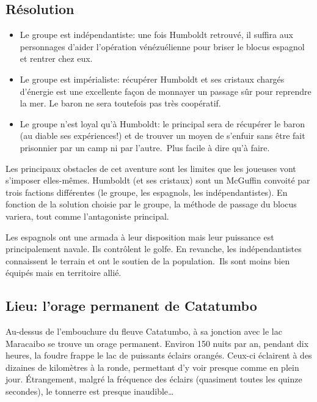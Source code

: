 \subsection{Résolution}

\begin{itemize}
	\item Le groupe est indépendantiste: une fois Humboldt retrouvé, il \og suffira \fg aux personnages d'aider l'opération vénézuélienne pour briser le blocus espagnol et rentrer chez eux. 
	\item Le groupe est impérialiste: récupérer Humboldt et ses cristaux chargés d'énergie est une excellente façon de monnayer un passage sûr pour reprendre la mer. Le baron ne sera toutefois pas très coopératif.
	\item Le groupe n'est loyal qu'à Humboldt: le principal sera de récupérer le baron (au diable ses expériences!) et de trouver un moyen de s'enfuir sans être fait prisonnier par un camp ni par l'autre. Plus facile à dire qu'à faire.
\end{itemize}

Les principaux obstacles de cet aventure sont les limites que les joueuses vont s'imposer elles-mêmes.
Humboldt (et ses cristaux) sont un McGuffin convoité par trois factions différentes (le groupe, les espagnols, les indépendantistes).
En fonction de la solution choisie par le groupe, la méthode de passage du blocus variera, tout comme l'antagoniste principal.

Les espagnols ont une armada à leur disposition mais leur puissance est principalement navale.
Ils contrôlent le golfe.
En revanche, les indépendantistes connaissent le terrain et ont le soutien de la population. Ils sont moins bien équipés mais en territoire allié.


\subsection{Lieu: l'orage permanent de Catatumbo}

\begin{tcolorbox}[colback=black!1!white]
Au-dessus de l'embouchure du fleuve Catatumbo, à sa jonction avec le lac Maracaibo se trouve un orage permanent.
Environ 150 nuits par an, pendant dix heures, la foudre frappe le lac de puissants éclairs orangés.
Ceux-ci éclairent à des dizaines de kilomètres à la ronde, permettant d'y voir presque comme en plein jour.
Étrangement, malgré la fréquence des éclairs (quasiment toutes les quinze secondes), le tonnerre est presque inaudible\dots
\end{tcolorbox}

\vfill
{}
\vfill
